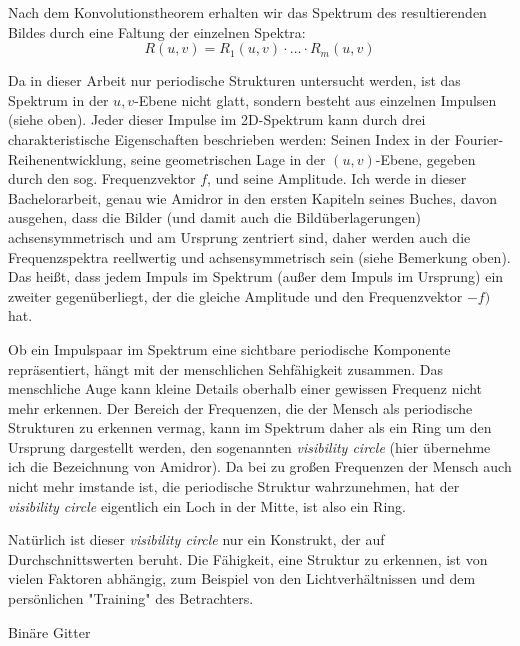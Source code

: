 \documentclass[a4paper]{article}
\begin{document}
Nach dem Konvolutionstheorem erhalten wir das Spektrum des resultierenden Bildes durch eine Faltung der einzelnen Spektra:
$$R(u,v)=R_1(u,v)\cdot \ldots \cdot R_m(u,v)$$

Da in dieser Arbeit nur periodische Strukturen untersucht werden, ist das Spektrum in der $u,v$-Ebene nicht glatt, sondern besteht aus einzelnen Impulsen (siehe oben). Jeder dieser Impulse im 2D-Spektrum kann durch drei charakteristische Eigenschaften beschrieben werden: Seinen Index in der Fourier-Reihenentwicklung, seine geometrischen Lage in der $(u,v)$-Ebene, gegeben durch den sog. Frequenzvektor $f$, und seine Amplitude.
Ich werde in dieser Bachelorarbeit, genau wie Amidror in den ersten Kapiteln seines Buches, davon ausgehen, dass die Bilder (und damit auch die Bildüberlagerungen) achsensymmetrisch und am Ursprung zentriert sind, daher werden auch die Frequenzspektra reellwertig und achsensymmetrisch sein (siehe Bemerkung oben). Das heißt, dass jedem Impuls im Spektrum (außer dem Impuls im Ursprung) ein zweiter gegenüberliegt, der die gleiche Amplitude und den Frequenzvektor $-f)$ hat.

Ob ein Impulspaar im Spektrum eine sichtbare periodische Komponente repräsentiert, hängt mit der menschlichen Sehfähigkeit zusammen. Das menschliche Auge kann kleine Details oberhalb einer gewissen Frequenz nicht mehr erkennen. Der Bereich der Frequenzen, die der Mensch als periodische Strukturen zu erkennen vermag, kann im Spektrum daher als ein Ring um den Ursprung dargestellt werden, den sogenannten \textit{visibility circle} (hier übernehme ich die Bezeichnung von Amidror). Da bei zu großen Frequenzen der Mensch auch nicht mehr imstande ist, die periodische Struktur wahrzunehmen, hat der \textit{visibility circle} eigentlich ein Loch in der Mitte, ist also ein Ring.

Natürlich ist dieser \textit{visibility circle} nur ein Konstrukt, der auf Durchschnittswerten beruht. Die Fähigkeit, eine Struktur zu erkennen, ist von vielen Faktoren abhängig, zum Beispiel von den Lichtverhältnissen und dem persönlichen "Training" des Betrachters.

Binäre Gitter
\end{document}
